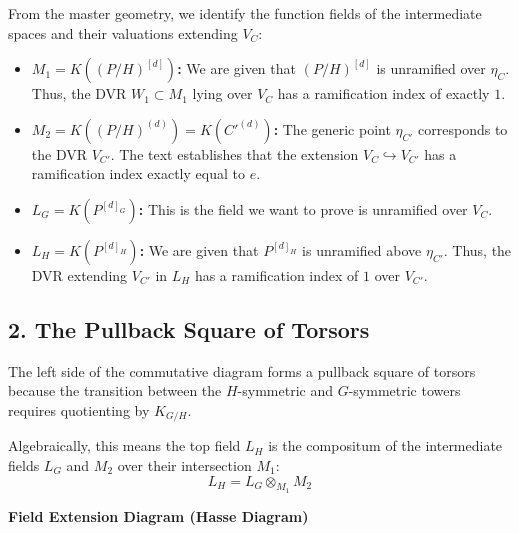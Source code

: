 From the master geometry, we identify the function fields of the intermediate spaces and their valuations extending $V_C$:
\begin{itemize}
    \item \textbf{$M_1 = K((P/H)^{[d]})$:} We are given that $(P/H)^{[d]}$ is unramified over $\eta_C$. Thus, the DVR $W_1 \subset M_1$ lying over $V_C$ has a ramification index of exactly $1$.
    \item \textbf{$M_2 = K((P/H)^{(d)}) = K(C'^{(d)})$:} The generic point $\eta_{C'}$ corresponds to the DVR $V_{C'}$. The text establishes that the extension $V_C \hookrightarrow V_{C'}$ has a ramification index exactly equal to $e$.
    \item \textbf{$L_G = K(P^{[d]_G})$:} This is the field we want to prove is unramified over $V_C$.
    \item \textbf{$L_H = K(P^{[d]_H})$:} We are given that $P^{[d]_H}$ is unramified above $\eta_{C'}$. Thus, the DVR extending $V_{C'}$ in $L_H$ has a ramification index of $1$ over $V_{C'}$.
\end{itemize}

\subsection*{2. The Pullback Square of Torsors}

The left side of the commutative diagram forms a pullback square of torsors because the transition between the $H$-symmetric and $G$-symmetric towers requires quotienting by $K_{G/H}$. 

Algebraically, this means the top field $L_H$ is the compositum of the intermediate fields $L_G$ and $M_2$ over their intersection $M_1$:
\[
L_H = L_G \otimes_{M_1} M_2
\]

\textbf{Field Extension Diagram (Hasse Diagram)}
\vspace{1em}
\begin{center}
\end{center}
\vspace{1em}


